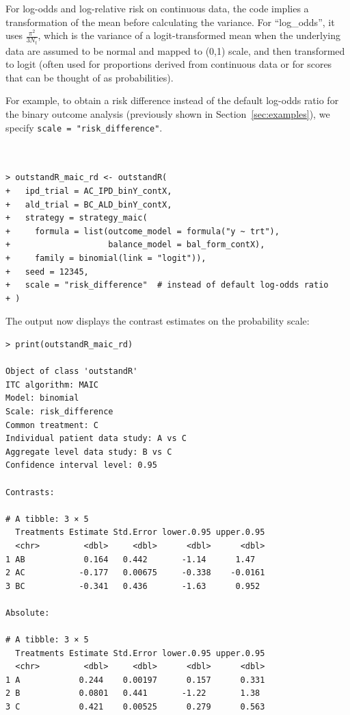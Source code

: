 \documentclass[article]{jss}
\begin{document}
For log-odds and log-relative risk on continuous data, the  code implies a transformation of the mean before calculating the variance. For ``log\_odds'', it uses $\frac{\pi^2}{3 N_t}$, which is the variance of a logit-transformed mean when the underlying data are assumed to be normal and mapped to (0,1) scale, and then transformed to logit (often used for proportions derived from continuous data or for scores that can be thought of as probabilities).


For example, to obtain a risk difference instead of the default log-odds ratio for the binary outcome analysis (previously shown in Section~\ref{sec:examples}), we specify \texttt{scale = "risk\_difference"}.\\
\\
\begin{minipage}{\linewidth}
\begin{verbatim}

> outstandR_maic_rd <- outstandR(
+   ipd_trial = AC_IPD_binY_contX, 
+   ald_trial = BC_ALD_binY_contX,
+   strategy = strategy_maic(
+     formula = list(outcome_model = formula("y ~ trt"),
+                    balance_model = bal_form_contX),
+     family = binomial(link = "logit")),
+   seed = 12345,
+   scale = "risk_difference"  # instead of default log-odds ratio
+ )

\end{verbatim}
\end{minipage}

The output now displays the contrast estimates on the probability scale:

\begin{verbatim}
> print(outstandR_maic_rd)

Object of class 'outstandR' 
ITC algorithm: MAIC 
Model: binomial 
Scale: risk_difference 
Common treatment: C 
Individual patient data study: A vs C 
Aggregate level data study: B vs C 
Confidence interval level: 0.95 

Contrasts:

# A tibble: 3 × 5
  Treatments Estimate Std.Error lower.0.95 upper.0.95
  <chr>         <dbl>     <dbl>      <dbl>      <dbl>
1 AB            0.164   0.442       -1.14      1.47  
2 AC           -0.177   0.00675     -0.338    -0.0161
3 BC           -0.341   0.436       -1.63      0.952 

Absolute:

# A tibble: 3 × 5
  Treatments Estimate Std.Error lower.0.95 upper.0.95
  <chr>         <dbl>     <dbl>      <dbl>      <dbl>
1 A            0.244    0.00197      0.157      0.331
2 B            0.0801   0.441       -1.22       1.38 
3 C            0.421    0.00525      0.279      0.563
\end{verbatim}
\end{document}

